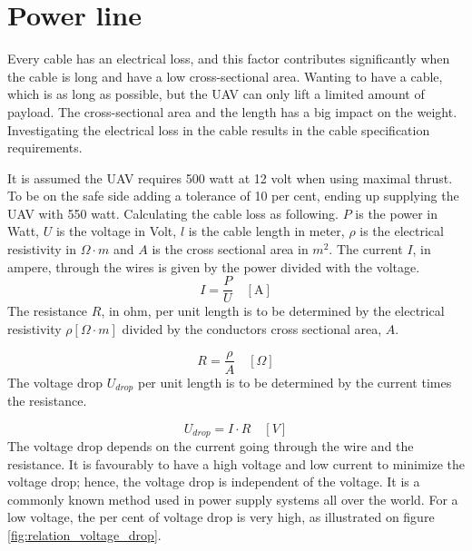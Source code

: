 \section{Power line}
\noindent
Every cable has an electrical loss, and this factor contributes significantly when the cable is long and have a low cross-sectional area. Wanting to have a cable, which is as long as possible, but the UAV can only lift a limited amount of payload. The cross-sectional area and the length has a big impact on the weight. Investigating the electrical loss in the cable results in the cable specification requirements.
 
\noindent
It is assumed the UAV requires 500 watt at 12 volt when using maximal thrust\cite{Wahlgreen2014}. To be on the safe side adding a tolerance of 10 per cent, ending up supplying the UAV with 550 watt. 
Calculating the cable loss as following. 
$P$ is the power in Watt, $U$ is the voltage in Volt, $l$ is the cable length in meter, $\rho$ is the electrical resistivity in $\Omega \cdot m$ and $A$ is the cross sectional area in $m^2$.
\noindent
The current $I$, in ampere, through the wires is given by the power divided with the voltage.
\begin{equation}
I = \frac{P}{U} \quad [\mathrm{A}]
\end{equation}
\noindent
The resistance $R$, in ohm, per unit length is to be determined by the electrical resistivity $\rho [\Omega \cdot m]$ divided by the conductors cross sectional area, $A$.

\begin{equation}
R = \frac{\rho}{A}\quad [\Omega]
\end{equation}
\noindent
The voltage drop $U_{drop}$ per unit length is to be determined by the current times the resistance.

\begin{equation}
U_{drop} = I \cdot R \quad [V]
\end{equation}
\noindent
The voltage drop depends on the current going through the wire and the resistance. It is favourably to have a high voltage and low current to minimize the voltage drop; hence, the voltage drop is independent of the voltage. It is a commonly known method used in power supply systems all over the world. For a low voltage, the per cent of voltage drop is very high, as illustrated on figure \ref{fig:relation_voltage_drop}.

